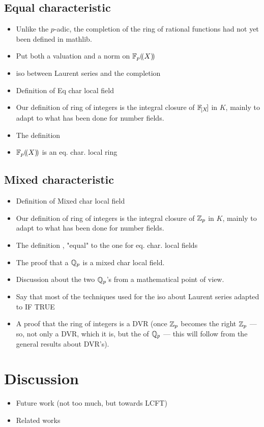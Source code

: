 \documentclass[sigplan,10pt,anonymous,review]{acmart}\settopmatter{printfolios=true,printccs=false,printacmref=false}
\begin{document}
\subsection{Equal characteristic}
\begin{itemize}
\item Unlike the $p$-adic, the completion of the ring of rational functions had not yet been defined in mathlib.
\item Put both a valuation and a norm on ${\mathbb{F}_{p}}(\!(X)\!)$
\item iso between Laurent series and the completion
\item Definition of Eq char local field
\item Our definition of ring of integers is the integral closure of $\powerseries$ in $K$, mainly to adapt to what has been done for number fields.
\item The definition 
\item ${\mathbb{F}_{p}}(\!(X)\!)$ is an eq. char. local ring 

\end{itemize}
\subsection{Mixed characteristic}
\begin{itemize}
\item Definition of Mixed char local field
\item Our definition of ring of integers is the integral closure of $\mathbb{Z}_p$ in $K$, mainly to adapt to what has been done for number fields.
\item The definition , "equal" to the one for eq. char. local fields
\item The proof that a $\mathbb{Q}_p$ is a mixed char local field.
\item Discussion about the two $\mathbb{Q}_p$'s from a mathematical point of view.
\item Say that most of the techniques used for the iso about Laurent series adapted to  IF TRUE
\item A proof that the ring of integers is a DVR (once $\mathbb{Z}_p$ becomes the right $\mathbb{Z}_p$ --- so, not only a DVR, which it is, but the  of $\mathbb{Q}_p$ --- this will follow from the general results about DVR's).
\end{itemize}


\section{Discussion}
\begin{itemize}
\item Future work (not too much, but towards LCFT)
\item Related works
\end{itemize}
\end{document}
